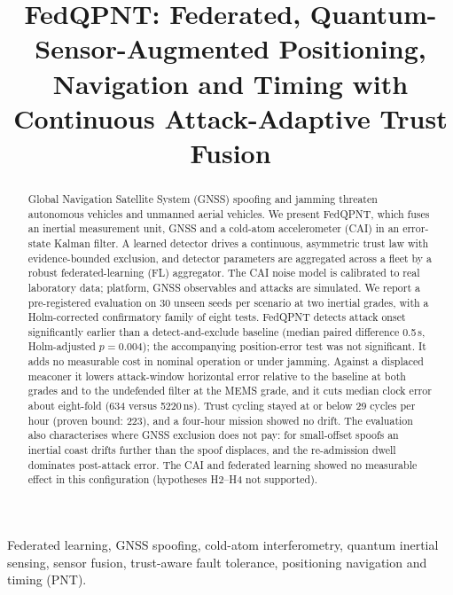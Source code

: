 \documentclass[journal]{IEEEtran}
\begin{document}
\title{FedQPNT: Federated, Quantum-Sensor-Augmented Positioning, Navigation and Timing with Continuous Attack-Adaptive Trust Fusion}

\author{
}

\maketitle

\begin{abstract}
Global Navigation Satellite System (GNSS) spoofing and jamming threaten autonomous vehicles and unmanned aerial vehicles. We present FedQPNT, which fuses an inertial measurement unit, GNSS and a cold-atom accelerometer (CAI) in an error-state Kalman filter. A learned detector drives a continuous, asymmetric trust law with evidence-bounded exclusion, and detector parameters are aggregated across a fleet by a robust federated-learning (FL) aggregator. The CAI noise model is calibrated to real laboratory data; platform, GNSS observables and attacks are simulated. We report a pre-registered evaluation on 30 unseen seeds per scenario at two inertial grades, with a Holm-corrected confirmatory family of eight tests. FedQPNT detects attack onset significantly earlier than a detect-and-exclude baseline (median paired difference 0.5\,s, Holm-adjusted $p=0.004$); the accompanying position-error test was not significant. It adds no measurable cost in nominal operation or under jamming. Against a displaced meaconer it lowers attack-window horizontal error relative to the baseline at both grades and to the undefended filter at the MEMS grade, and it cuts median clock error about eight-fold (634 versus 5220\,ns). Trust cycling stayed at or below 29 cycles per hour (proven bound: 223), and a four-hour mission showed no drift. The evaluation also characterises where GNSS exclusion does not pay: for small-offset spoofs an inertial coast drifts further than the spoof displaces, and the re-admission dwell dominates post-attack error. The CAI and federated learning showed no measurable effect in this configuration (hypotheses H2--H4 not supported).
\end{abstract}

\begin{IEEEkeywords}
Federated learning, GNSS spoofing, cold-atom interferometry, quantum inertial sensing, sensor fusion, trust-aware fault tolerance, positioning navigation and timing (PNT).
\end{IEEEkeywords}
\end{document}
